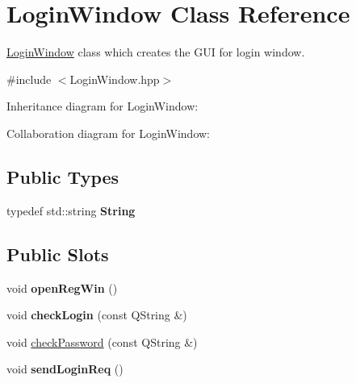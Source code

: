 \hypertarget{classLoginWindow}{}\section{Login\+Window Class Reference}
\label{classLoginWindow}


\hyperlink{classLoginWindow}{Login\+Window} class which creates the G\+UI for login window.  




{\ttfamily \#include $<$Login\+Window.\+hpp$>$}



Inheritance diagram for Login\+Window\+:


Collaboration diagram for Login\+Window\+:
\subsection*{Public Types}
\begin{DoxyCompactItemize}
\item 
typedef std\+::string {\bfseries String}\hypertarget{classLoginWindow_a9d5191a38906ea9c5375c1029cfd9d4d}{}\label{classLoginWindow_a9d5191a38906ea9c5375c1029cfd9d4d}

\end{DoxyCompactItemize}
\subsection*{Public Slots}
\begin{DoxyCompactItemize}
\item 
void {\bfseries open\+Reg\+Win} ()\hypertarget{classLoginWindow_abe06ec97d678045c810e2ac6033ee9c0}{}\label{classLoginWindow_abe06ec97d678045c810e2ac6033ee9c0}

\item 
void {\bfseries check\+Login} (const Q\+String \&)\hypertarget{classLoginWindow_a01edb22f1bf6dfdf3bd0811f6c878330}{}\label{classLoginWindow_a01edb22f1bf6dfdf3bd0811f6c878330}

\item 
void \hyperlink{classLoginWindow_ad5a16b9244af77d36f98a4f48d3d423d}{check\+Password} (const Q\+String \&)
\item 
void {\bfseries send\+Login\+Req} ()\hypertarget{classLoginWindow_ac6dc94a63017e4e500b7ec0cbd4cac33}{}\label{classLoginWindow_ac6dc94a63017e4e500b7ec0cbd4cac33}

\end{DoxyCompactItemize}

